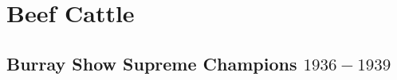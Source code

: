 \chapter{Beef Cattle}
\section[Supreme Champions]{Burray Show Supreme Champions $1936 - 1939$}
\small

\normalsize
